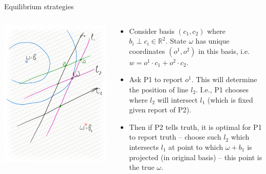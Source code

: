 \documentclass[english,10pt
,aspectratio=169
]{beamer}
\begin{document}
\begin{frame}{Equilibrium strategies}
\begin{columns}
	\begin{column}{0.5\textwidth}
		\begin{center}
			\includegraphics[scale=0.18]{pics/M4/battaglini04.png}
		\end{center}
	\end{column}
	\begin{column}{0.5\textwidth}
		{\small
			\begin{itemize}
				\item Consider basis $(c_1,c_2)$ where $b_i \perp c_i \in \mathbb{R}^2$. State $\omega$ has unique coordinates $(o^1,o^2)$ in this basis, i.e. $w = o^1 \cdot c_1 + o^2 \cdot c_2$.
				\item Ask P1 to report $o^1$. This will determine the position of line $l_2$. I.e., P1 chooses where $l_2$ will intersect $l_1$ (which is fixed given report of P2).
				\item Then if P2 tells truth, it is optimal for P1 to report truth -- choose such $l_2$ which intersects $l_1$ at point to which $\omega+b_1$ is projected (in original basis) -- this point is the true $\omega$.
			\end{itemize}
		}
	\end{column}
\end{columns}
\end{frame}
\end{document}
